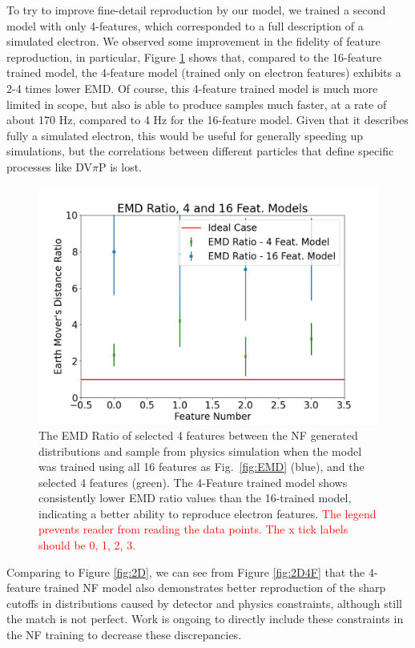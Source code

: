 To try to improve fine-detail reproduction by our model, we trained a second model with only 4-features, which corresponded to a full description of a simulated electron. We observed some improvement in the fidelity of feature reproduction, in particular, Figure \ref{fig:EMD2} shows that, compared to the 16-feature trained model, the 4-feature model (trained only on electron features) exhibits a 2-4 times lower EMD. Of course, this 4-feature trained model is much more limited in scope, but also is able to produce samples much faster, at a rate of about 170 Hz, compared to 4 Hz for the 16-feature model. Given that it describes fully a simulated electron, this would be useful for generally speeding up simulations, but the correlations between different particles that define specific processes like DV$\pi$P is lost. 


\begin{figure}[htb]
    \centering
    \includegraphics[width=.47\textwidth,trim={ 0 0 0 0},clip]{Chapters/Ch3-Simulations/normalizing_flows/pics/FinalPictures/EMD/emdratio416.png}
    \caption{The EMD Ratio of selected 4 features between the NF generated distributions and sample from physics simulation when the model was trained using all 16 features as Fig.~\ref{fig:EMD} (blue), and the selected 4 features (green). The 4-Feature trained model shows consistently lower EMD ratio values than the 16-trained model, indicating a better ability to reproduce electron features. \textcolor{red}{The legend prevents reader from reading the data points. The x tick labels should be 0, 1, 2, 3.}}
    \label{fig:EMD2}
\end{figure}

Comparing to Figure \ref{fig:2D}, we can see from Figure \ref{fig:2D4F} that the 4-feature trained NF model also demonstrates better reproduction of the sharp cutoffs in distributions caused by detector and physics constraints, although still the match is not perfect. Work is ongoing to directly include these constraints in the NF training to decrease these discrepancies.

